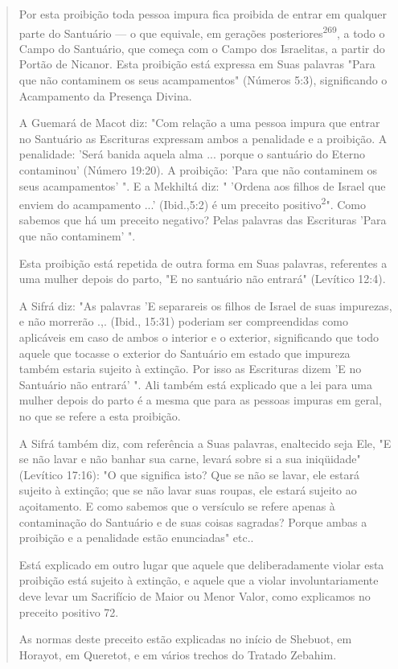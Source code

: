 \begin{quote}
Por esta proibição toda pessoa impura fica proibida de entrar em
qual­quer parte do Santuário --- o que equivale, em gerações
posteriores\textsuperscript{269}, a todo o Campo do Santuário, que
começa com o Campo dos Israelitas, a partir do Portão de Nicanor. Esta
proibição está expressa em Suas palavras "Para que não contaminem os
seus acampamentos" (Números 5:3), significando o Acampa­mento da
Presença Divina.

A Guemará de Macot diz: "Com relação a uma pessoa impura que entrar no
Santuário as Escrituras expressam ambos a penalidade e a proibição. A
penalidade: 'Será banida aquela alma ... porque o santuário do Eterno
conta­minou' (Número 19:20). A proibição: 'Para que não contaminem os
seus acam­pamentos' ". E a Mekhiltá diz: " 'Ordena aos filhos de Israel
que enviem do acampamento ...' (Ibid.,5:2) é um preceito
positivo\textsuperscript{2}". Como sabemos que há um preceito negativo?
Pelas palavras das Escrituras 'Para que não contaminem' ".

Esta proibição está repetida de outra forma em Suas palavras,
refe­rentes a uma mulher depois do parto, "E no santuário não entrará"
(Levítico 12:4).

A Sifrá diz: "As palavras 'E separareis os filhos de Israel de suas
im­purezas, e não morrerão .,. (Ibid., 15:31) poderiam ser compreendidas
como aplicáveis em caso de ambos o interior e o exterior, significando
que todo aquele que tocasse o exterior do Santuário em estado que
impureza também estaria sujeito à extinção. Por isso as Escrituras dizem
'E no Santuário não entrará' ". Ali também está explicado que a lei para
uma mulher depois do parto é a mes­ma que para as pessoas impuras em
geral, no que se refere a esta proibição.

A Sifrá também diz, com referência a Suas palavras, enaltecido seja Ele,
"E se não lavar e não banhar sua carne, levará sobre si a sua
iniqüidade" (Levítico 17:16): "O que significa isto? Que se não se
lavar, ele estará sujeito à extinção; que se não lavar suas roupas, ele
estará sujeito ao açoitamento. E como sabemos que o versículo se refere
apenas à contaminação do Santuário e de suas coisas sagradas? Porque
ambas a proibição e a penalidade estão enun­ciadas" etc..

Está explicado em outro lugar que aquele que deliberadamente vio­lar
esta proibição está sujeito à extinção, e aquele que a violar
involuntariamen­te deve levar um Sacrifício de Maior ou Menor Valor,
como explicamos no pre­ceito positivo 72.

As normas deste preceito estão explicadas no início de Shebuot, em
Horayot, em Queretot, e em vários trechos do Tratado Zebahim.
\end{quote}

